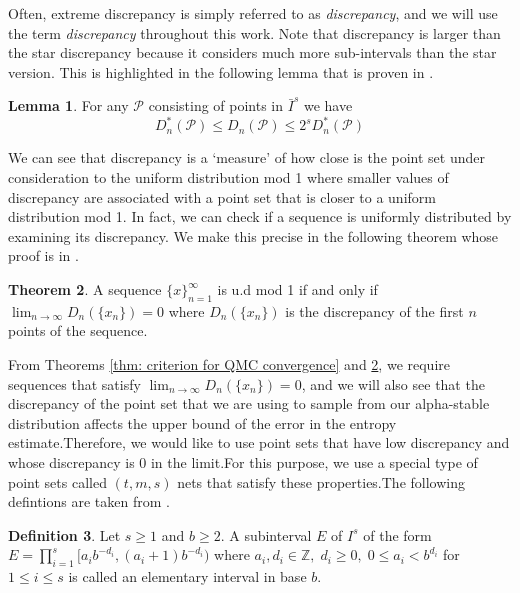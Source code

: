 \documentclass{article}
\theoremstyle{definition}
\newtheorem{definition}{Definition}[section]
\newtheorem{lemma}[definition]{Lemma}
\newtheorem{theorem}[definition]{Theorem}
\begin{document}
\noindent Often, extreme discrepancy is simply referred to as \emph{discrepancy}, and we will use the term \emph{discrepancy} throughout this work. Note that discrepancy is larger than the star discrepancy because it considers much more sub-intervals than the star version. This is highlighted in the following lemma that is proven in \cite{NiederreiterHarald1992Rnga}.

\begin{lemma} 
For any \(\mathcal{P}\) consisting of points in \(\bar{I}^{s}\) we have
\begin{equation}\label{discrepancy and extreme discrepancy}
D_n^{\ast}(\mathcal{P})\leq D_n(\mathcal{P}) \leq 2^{s} D_n^{\ast}(\mathcal{P})
\end{equation}
\end{lemma}

\noindent We can see that discrepancy is a `measure' of how close is the point set under consideration to the uniform distribution mod 1 where smaller values of discrepancy are associated with a point set that is closer to a uniform distribution mod 1. In fact, we can check if a sequence is uniformly distributed by examining its discrepancy. We make this precise in the following theorem whose proof is in \cite{alma991015801878809621}.

\begin{theorem}\label{discrepancy equivalent}
    A sequence $\{x\}_{n=1}^{\infty}$ is u.d mod 1 if and only if $\lim_{n\to\infty}D_n(\{x_n\})=0$ where $D_n(\{x_n\})$ is the discrepancy of the first $n$ points of the sequence. 
\end{theorem}

\noindent From Theorems \ref{thm: criterion for QMC convergence} and \ref{discrepancy equivalent}, we require sequences that satisfy $\lim_{n\to\infty}D_n(\{x_n\})=0$, and we will also  see that the discrepancy of the point set that we are using to sample from our alpha-stable distribution affects the upper bound of the error in the entropy estimate.Therefore, we would like to use point sets that have low discrepancy and whose discrepancy is 0 in the limit.For this purpose, we use a special type of point sets called $(t,m,s)$ nets that satisfy these properties.The following defintions are taken from \cite{NiederreiterHarald1992Rnga}.

\begin{definition}
 Let \(s\geq 1\) and \(b\geq 2\). A subinterval \(E\) of \(I^s\) of the form \(E=\prod_{i=1}^s[a_ib^{-d_i},(a_i+1)b^{-d_i})\) where \(a_i,d_i\in\mathbb{Z},\; d_i\geq 0,\;0\leq a_i<b^{d_i}\) for \(1\leq i\leq s\) is called an elementary interval in base \(b\).
 \end{definition}
 
\end{document}

